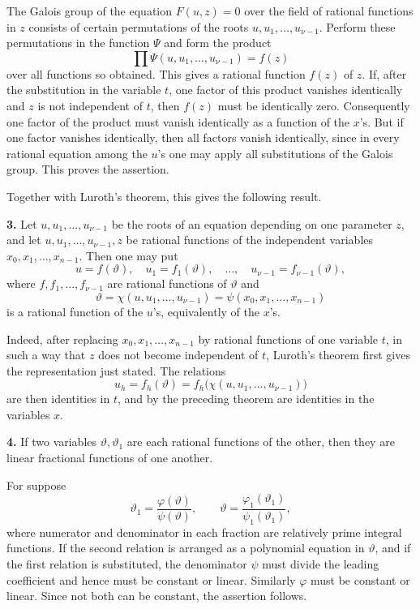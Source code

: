 \documentclass[12pt,a4paper]{article}
\begin{document}
The Galois group of the equation $F(u,z)=0$ over the field of rational functions in $z$ consists of certain permutations of the roots $u,u_1,
\ldots,u_{\nu-1}$.  Perform these permutations in the function $\Psi$ and form the product
\begin{equation}
 \prod \Psi(u,u_1,\ldots,u_{\nu-1})=f(z)
\end{equation}
over all functions so obtained.  This gives a rational function $f(z)$ of $z$.  If, after the substitution in the variable $t$, one factor of this product vanishes identically and $z$ is not independent of $t$, then $f(z)$ must be identically zero.  Consequently one factor of the product must vanish identically as a function of the $x$'s.  But if one factor vanishes identically, then all factors vanish identically, since in every rational equation among the $u$'s one may apply all substitutions of the Galois group.  This proves the assertion.

Together with Luroth's theorem, this gives the following result.

\textbf{3.} Let $u,u_1,
\ldots,u_{\nu-1}$ be the roots of an equation depending on one parameter $z$, and let $u,u_1,
\ldots,u_{\nu-1},z$ be rational functions of the independent variables $x_0,x_1,
\ldots,x_{n-1}$.  Then one may put
\begin{equation}
 u=f(\vartheta),\quad u_1=f_1(\vartheta),\quad\ldots,\quad
 u_{\nu-1}=f_{\nu-1}(\vartheta),
\end{equation}
where $f,f_1,
\ldots,f_{\nu-1}$ are rational functions of $\vartheta$ and
\begin{equation}
 \vartheta=\chi(u,u_1,
\ldots,u_{\nu-1})=\psi(x_0,x_1,
\ldots,x_{n-1})
\end{equation}
is a rational function of the $u$'s, equivalently of the $x$'s.

Indeed, after replacing $x_0,x_1,
\ldots,x_{n-1}$ by rational functions of one variable $t$, in such a way that $z$ does not become independent of $t$, Luroth's theorem first gives the representation just stated.  The relations
\[
 u_h=f_h(\vartheta)=f_h\bigl(\chi(u,u_1,
\ldots,u_{\nu-1})\bigr)
\]
are then identities in $t$, and by the preceding theorem are identities in the variables $x$.

\textbf{4.} If two variables $\vartheta,\vartheta_1$ are each rational functions of the other, then they are linear fractional functions of one another.

For suppose
\[
 \vartheta_1=\frac{\varphi(\vartheta)}{\psi(\vartheta)},
 \qquad
 \vartheta=\frac{\varphi_1(\vartheta_1)}{\psi_1(\vartheta_1)},
\]
where numerator and denominator in each fraction are relatively prime integral functions.  If the second relation is arranged as a polynomial equation in $\vartheta$, and if the first relation is substituted, the denominator $\psi$ must divide the leading coefficient and hence must be constant or linear.  Similarly $\varphi$ must be constant or linear.  Since not both can be constant, the assertion follows.
\end{document}
